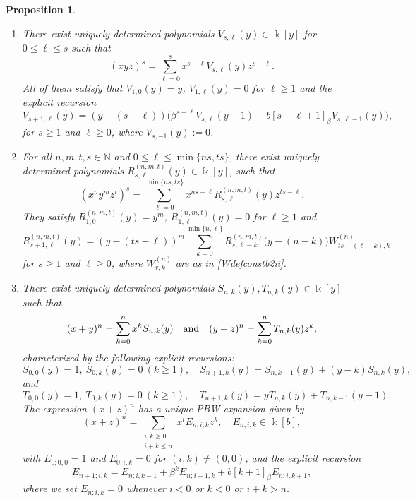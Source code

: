 \documentclass{amsart}
\newtheorem{proposition}[theorem]{Proposition}
\theoremstyle{definition}
\theoremstyle{remark}
\numberwithin{equation}{section}
\begin{document}
\begin{proposition}
\begin{enumerate}
\item [\rm (3)] There exist uniquely determined polynomials $V_{s,\ell}(y)\in\Bbbk[y]$ for $0\le \ell\le s$ such that
\begin{equation}\label{Vdefconstb2ii}
(xyz)^s=\sum_{\ell=0}^{s} x^{s-\ell}V_{s,\ell}(y)z^{s-\ell}.
\end{equation}
All of them satisfy that $V_{1,0}(y) = y$, $V_{1,\ell}(y) = 0$ for $\ell\ge 1$ and the explicit recursion
\begin{equation}\label{Vrecconstb2ii}
V_{s+1,\ell}(y) =(y-(s-\ell))\Big(\beta^{s-\ell}V_{s,\ell}(y-1)+b[s-\ell+1]_\beta  V_{s,\ell-1}(y)\Big), 
\end{equation}
for $s\ge 1$ and $\ell\ge 0$, where $V_{s,-1}(y):=0$.

\item[\rm (4)] For all $n, m, t, s\in\mathbb{N}$ and  $0\le \ell\le \min\{ns,ts\}$, there exist uniquely determined polynomials
$R^{(n,m,t)}_{s,\ell}(y)\in\Bbbk[y]$,  such that
\begin{equation}\label{Rdefconstb2ii}
(x^n y^m z^t)^s = \sum_{\ell=0}^{\min\{ns,ts\}} x^{ns-\ell}R^{(n,m,t)}_{s,\ell}(y)z^{ts-\ell}.
\end{equation}
They satisfy $R^{(n,m,t)}_{1,0}(y)=y^m$, $R^{(n,m,t)}_{1,\ell}(y)=0$ for $\ell\ge 1$ and 
\begin{equation}\label{Rrecconstb2ii}
R^{(n,m,t)}_{s+1,\ell}(y)=(y-(ts-\ell))^{m} \sum_{k=0}^{\min\{n,\ell\}}R^{(n,m,t)}_{s,\ell-k}\big(y-(n-k)\big)
W^{(n)}_{ts-(\ell-k),k},
\end{equation}
for $s\ge 1$ and $\ell\ge 0$, where $W^{(n)}_{r,k}$ are as in \eqref{Wdefconstb2ii}.

\item[\rm (5)] There exist uniquely determined polynomials $S_{n,k}(y),T_{n,k}(y)\in\Bbbk[y]$ such that
\[
(x+y)^n = \sum_{k=0}^{n} x^{k}S_{n,k}(y) \quad {\rm and} \quad (y+z)^n=\sum_{k=0}^{n} T_{n,k}(y)z^{k},
\]
characterized by the following explicit recursions:
\[
S_{0,0}(y) = 1,\ S_{0,k}(y)=0\ (k\ge 1),\quad S_{n+1,k}(y)=S_{n,k-1}(y)+(y-k)S_{n,k}(y),
\]
and 
\[
T_{0,0}(y)=1,\ T_{0,k}(y)=0\ (k\ge 1),\quad T_{n+1,k}(y)=yT_{n,k}(y)+T_{n,k-1}(y-1).
\]
The expression $(x+z)^n$ has a unique PBW expansion given by
\begin{equation}\label{Edefconstb2ii}
(x+z)^n = \sum_{\substack{i,k\ge 0\\ i+k\le n}} x^{i}E_{n;i,k}z^{k}, \quad E_{n;i,k}\in\Bbbk[b],
\end{equation}
with $E_{0;0,0}=1$ and $E_{0;i,k}=0$ for $(i,k)\neq(0,0)$, and the explicit recursion
\begin{equation}\label{Erecconstb2ii}
E_{n+1;i,k}=E_{n;i,k-1}+\beta^{k}E_{n;i-1,k}+b[k+1]_\beta E_{n;i,k+1},
\end{equation}
where we set $E_{n;i,k} = 0$ whenever $i < 0$ or $k < 0$ or $i + k > n$.
\end{enumerate}
\end{proposition}
\end{document}
